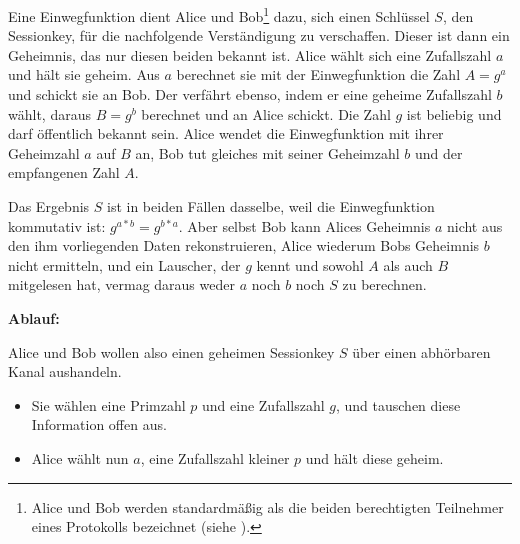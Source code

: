\begin{refsegment}
Eine Einwegfunktion dient Alice und Bob\footnote{%
Alice und Bob werden standardmäßig als die beiden
berechtigten Teilnehmer eines Protokolls bezeichnet (siehe
\cite[Seite 23]{Schneier1996}).
} dazu, sich einen Schlüssel $S$, den Sessionkey, für die nachfolgende
Verständigung zu verschaffen. Dieser ist dann ein Geheimnis, das nur diesen
beiden bekannt ist. Alice wählt sich eine Zufallszahl $a$ und hält sie geheim.
Aus $a$ berechnet sie mit der Einwegfunktion die Zahl $A = g^a$ und schickt sie
an Bob. Der verfährt ebenso, indem er eine geheime Zufallszahl $b$ wählt,
daraus $B = g^b$ berechnet und an Alice schickt. Die Zahl $g$ ist beliebig und
darf öffentlich bekannt sein. Alice wendet die Einwegfunktion mit ihrer
Geheimzahl $a$ auf $B$ an, Bob tut gleiches mit seiner Geheimzahl $b$ und der
empfangenen Zahl $A$.

Das Ergebnis $S$ ist in beiden Fällen dasselbe, weil die Einwegfunktion
kommutativ ist: $g^{a*b} = g^{b*a}$. Aber selbst Bob kann Alices Geheimnis $a$ nicht aus
den ihm vorliegenden Daten rekonstruieren, Alice wiederum Bobs Geheimnis $b$
nicht ermitteln, und ein Lauscher, der $g$ kennt und sowohl $A$ als auch $B$
mitgelesen hat, vermag daraus weder $a$ noch $b$ noch $S$ zu berechnen.



 \textbf{Ablauf:}\par
\nopagebreak
 Alice und Bob wollen also einen geheimen Sessionkey $S$ über einen
abhörbaren Kanal aushandeln.
\begin{itemize}
   \item[\textbf{1.}] Sie wählen eine Primzahl $p$ und eine Zufallszahl $g$, und tauschen diese
                 Information offen aus.
   \item[\textbf{2.}] Alice wählt nun $a$, eine Zufallszahl kleiner $p$ und
                 hält diese geheim.


\end{itemize}
\end{refsegment}
